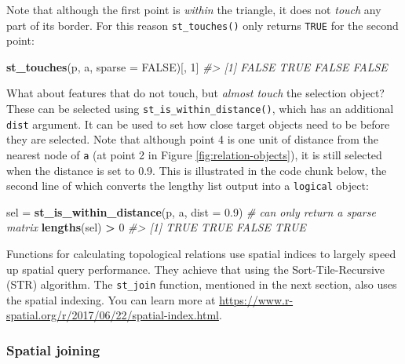 \documentclass[]{krantz}
\newenvironment{Shaded}{\begin{snugshade}}{\end{snugshade}}
\newcommand{\CommentTok}[1]{\textcolor[rgb]{0.37,0.37,0.37}{\textit{#1}}}
\newcommand{\DataTypeTok}[1]{\textcolor[rgb]{0.27,0.27,0.27}{#1}}
\newcommand{\DecValTok}[1]{\textcolor[rgb]{0.06,0.06,0.06}{#1}}
\newcommand{\FloatTok}[1]{\textcolor[rgb]{0.06,0.06,0.06}{#1}}
\newcommand{\KeywordTok}[1]{\textcolor[rgb]{0.27,0.27,0.27}{\textbf{#1}}}
\newcommand{\NormalTok}[1]{#1}
\newcommand{\OperatorTok}[1]{\textcolor[rgb]{0.43,0.43,0.43}{\textbf{#1}}}
\newcommand{\OtherTok}[1]{\textcolor[rgb]{0.37,0.37,0.37}{#1}}
\newcommand{\StringTok}[1]{\textcolor[rgb]{0.5,0.5,0.5}{#1}}
\let\BeginKnitrBlock\begin \let\EndKnitrBlock\end
\begin{document}
Note that although the first point is \emph{within} the triangle, it does not \emph{touch} any part of its border.
For this reason \texttt{st\_touches()} only returns \texttt{TRUE} for the second point:

\begin{Shaded}
\begin{Highlighting}[]
\KeywordTok{st_touches}\NormalTok{(p, a, }\DataTypeTok{sparse =} \OtherTok{FALSE}\NormalTok{)[, }\DecValTok{1}\NormalTok{]}
\CommentTok{#> [1] FALSE  TRUE FALSE FALSE}
\end{Highlighting}
\end{Shaded}

What about features that do not touch, but \emph{almost touch} the selection object?
These can be selected using \texttt{st\_is\_within\_distance()}, which has an additional \texttt{dist} argument.
It can be used to set how close target objects need to be before they are selected.
Note that although point 4 is one unit of distance from the nearest node of \texttt{a} (at point 2 in Figure \ref{fig:relation-objects}), it is still selected when the distance is set to 0.9.
This is illustrated in the code chunk below, the second line of which converts the lengthy list output into a \texttt{logical} object:

\begin{Shaded}
\begin{Highlighting}[]
\NormalTok{sel =}\StringTok{ }\KeywordTok{st_is_within_distance}\NormalTok{(p, a, }\DataTypeTok{dist =} \FloatTok{0.9}\NormalTok{) }\CommentTok{# can only return a sparse matrix}
\KeywordTok{lengths}\NormalTok{(sel) }\OperatorTok{>}\StringTok{ }\DecValTok{0}
\CommentTok{#> [1]  TRUE  TRUE FALSE  TRUE}
\end{Highlighting}
\end{Shaded}

\BeginKnitrBlock{rmdnote}
Functions for calculating topological relations use spatial indices to largely speed up spatial query performance.
They achieve that using the Sort-Tile-Recursive (STR) algorithm.
The \texttt{st\_join} function, mentioned in the next section, also uses the spatial indexing.
You can learn more at \url{https://www.r-spatial.org/r/2017/06/22/spatial-index.html}.
\EndKnitrBlock{rmdnote}

\hypertarget{spatial-joining}{%
\subsubsection{Spatial joining}\label{spatial-joining}}
\end{document}
